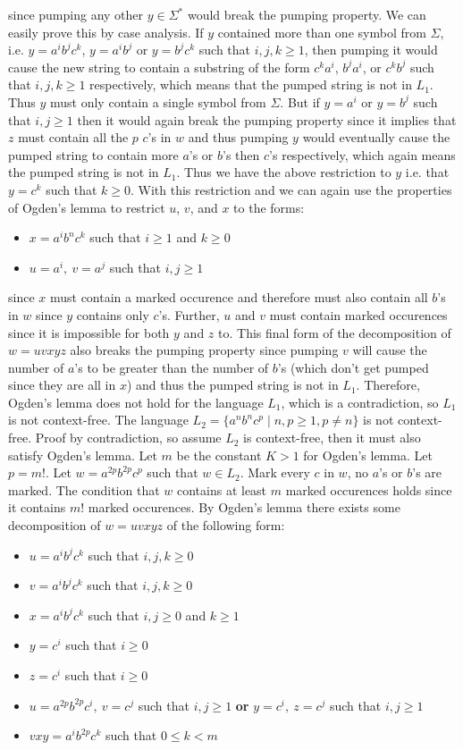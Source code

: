 \documentclass[12pt]{article}
\begin{document}
since pumping any other $y \in \Sigma^*$ would break the pumping property. We
can easily prove this by case analysis. If $y$ contained more than one symbol
from $\Sigma$, i.e. $y=a^ib^jc^k$, $y=a^ib^j$ or $y=b^jc^k$ such that $i,j,k\ge
1$, then pumping it would cause the new string to contain a substring of the
form $c^ka^i$, $b^ja^i$, or $c^kb^j$ such that $i,j,k\ge 1$ respectively,
which means that the pumped string is not in $L_1$. Thus $y$ must only contain
a single symbol from $\Sigma$. But if $y=a^i$ or $y=b^j$ such that $i,j\ge 1$
then it would again break the pumping property since it implies that $z$ must
contain all the $p$ $c$'s in $w$ and thus pumping $y$ would eventually cause
the pumped string to contain more $a$'s or $b$'s then $c$'s respectively,
which again means the pumped string is not in $L_1$. Thus we have the above
restriction to $y$ i.e. that $y=c^k$ such that $k\ge 0$. With this restriction
and we can again use the properties of Ogden's lemma to restrict $u$, $v$, and
$x$ to the forms:
\begin{itemize}
\item $x=a^ib^nc^k$ such that $i\ge 1$ and $k\ge 0$
\item $u=a^i,\ v=a^j$ such that $i,j\ge 1$
\end{itemize}
since $x$ must contain a marked occurence and therefore must also contain all
$b$'s in $w$ since $y$ contains only $c$'s. Further, $u$ and $v$ must contain
marked occurences since it is impossible for both $y$ and $z$ to. This final
form of the decomposition of $w=uvxyz$ also breaks the pumping property since
pumping $v$ will cause the number of $a$'s to be greater than the number of
$b$'s (which don't get pumped since they are all in $x$) and thus the pumped
string is not in $L_1$. Therefore, Ogden's lemma does not hold for the language
$L_1$, which is a contradiction, so $L_1$ is not context-free.
\newpage
The language $L_2 = \{a^nb^nc^p \mid n,p\ge 1, p\neq n\}$ is not context-free.
Proof by contradiction, so assume $L_2$ is context-free, then it must also
satisfy Ogden's lemma. Let $m$ be the constant $K > 1$ for Ogden's lemma.
Let $p=m!$. Let $w = a^{2p}b^{2p}c^p$ such that $w \in L_2$. Mark every $c$ in
$w$, no $a$'s or $b$'s are marked. The condition that $w$ contains at least $m$
marked occurences holds since it contains $m!$ marked occurences. By Ogden's
lemma there exists some decomposition of $w = uvxyz$ of the following form:
\begin{itemize}
\item $u=a^ib^jc^k$ such that $i,j,k\ge 0$
\item $v=a^ib^jc^k$ such that $i,j,k\ge 0$
\item $x=a^ib^jc^k$ such that $i,j\ge 0$ and $k\ge 1$
\item $y=c^i$ such that $i\ge 0$
\item $z=c^i$ such that $i\ge 0$
\item $u=a^{2p}b^{2p}c^i,\ v=c^j$ such that $i,j\ge 1$ \textbf{or}
$y=c^i,\ z=c^j$ such that $i,j\ge 1$
\item $vxy = a^ib^{2p}c^k$ such that $0\le k<m$
\end{itemize}
\end{document}
